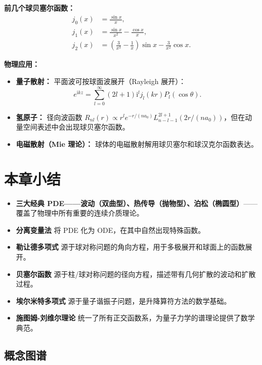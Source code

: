 \textbf{前几个球贝塞尔函数：}
\begin{align}
j_0(x) &= \frac{\sin x}{x},\\
j_1(x) &= \frac{\sin x}{x^2} - \frac{\cos x}{x},\\
j_2(x) &= \left(\frac{3}{x^3} - \frac{1}{x}\right)\sin x - \frac{3}{x^2}\cos x.
\end{align}

\textbf{物理应用：}
\begin{itemize}
\item \textbf{量子散射：} 平面波可按球面波展开（Rayleigh 展开）：
\begin{equation}
e^{\mathrm{i}kz} = \sum_{l=0}^{\infty} (2l+1)\mathrm{i}^l j_l(kr) P_l(\cos\theta).
\end{equation}
\item \textbf{氢原子：} 径向波函数 $R_{nl}(r) \propto r^l e^{-r/(na_0)} L_{n-l-1}^{2l+1}(2r/(na_0))$，但在动量空间表述中会出现球贝塞尔函数。
\item \textbf{电磁散射（Mie 理论）：} 球体的电磁散射解用球贝塞尔和球汉克尔函数表达。
\end{itemize}

\section{本章小结}

\begin{itemize}
\item \textbf{三大经典 PDE——波动（双曲型）、热传导（抛物型）、泊松（椭圆型）}——覆盖了物理中所有重要的连续介质理论。
\item \textbf{分离变量法} 将 PDE 化为 ODE，在其中自然出现特殊函数。
\item \textbf{勒让德多项式} 源于球对称问题的角向方程，用于多极展开和球面上的函数展开。
\item \textbf{贝塞尔函数} 源于柱/球对称问题的径向方程，描述带有几何扩散的波动和扩散过程。
\item \textbf{埃尔米特多项式} 源于量子谐振子问题，是升降算符方法的数学基础。
\item \textbf{施图姆-刘维尔理论} 统一了所有正交函数系，为量子力学的谱理论提供了数学典范。
\end{itemize}

\subsection*{概念图谱}

